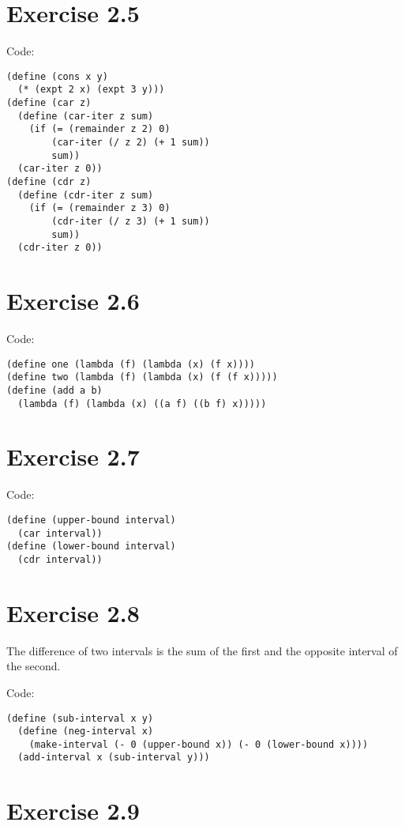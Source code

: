 \documentclass[../main.tex]{subfiles}
\begin{document}
\section{Exercise 2.5}

Code:

\begin{lstlisting}
(define (cons x y)
  (* (expt 2 x) (expt 3 y)))
(define (car z)
  (define (car-iter z sum)
    (if (= (remainder z 2) 0)
        (car-iter (/ z 2) (+ 1 sum))
        sum))
  (car-iter z 0))
(define (cdr z)
  (define (cdr-iter z sum)
    (if (= (remainder z 3) 0)
        (cdr-iter (/ z 3) (+ 1 sum))
        sum))
  (cdr-iter z 0))
\end{lstlisting}

\section{Exercise 2.6}

Code:

\begin{lstlisting}
(define one (lambda (f) (lambda (x) (f x))))
(define two (lambda (f) (lambda (x) (f (f x)))))
(define (add a b)
  (lambda (f) (lambda (x) ((a f) ((b f) x)))))
\end{lstlisting}

\section{Exercise 2.7}

Code:

\begin{lstlisting}
(define (upper-bound interval)
  (car interval))
(define (lower-bound interval)
  (cdr interval))
\end{lstlisting}

\section{Exercise 2.8}

The difference of two intervals is the
 sum of the first and the opposite interval
 of the second.

Code:

\begin{lstlisting}
(define (sub-interval x y)
  (define (neg-interval x)
    (make-interval (- 0 (upper-bound x)) (- 0 (lower-bound x))))
  (add-interval x (sub-interval y)))
\end{lstlisting}

\section{Exercise 2.9}
\end{document}
